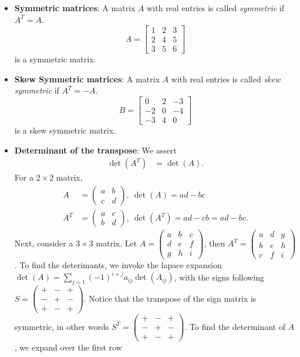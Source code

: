 \documentclass{report}
\begin{document}
\begin{itemize}
    \item \textbf{Symmetric matrices}: A matrix \( A \) with real entries is called \textit{symmetric} if \( A^T = A \).
        \[
            A = \begin{bmatrix}
                1 & 2 & 3 \\
                2 & 4 & 5 \\
                3 & 5 & 6
            \end{bmatrix}
        \]
        is a symmetric matrix.
    \item \textbf{Skew Symmetric matrices}: A matrix \( A \) with real entries is called \textit{skew symmetric} if \( A^T = -A \).
        \[
            B = \begin{bmatrix}
                0 & 2 & -3 \\
                -2 & 0 & -4 \\
                -3 & 4 & 0
            \end{bmatrix}
        \]
        is a skew symmetric matrix.
    \item \textbf{Determinant of the transpose}: We assert
        \begin{align*}
            \det(A^{T}) &= \det(A)
        .\end{align*}
        \bigbreak \noindent 
        For a $2\times 2$ matrix,
        \begin{align*}
            A &= \begin{pmatrix} a & b \\ c & d\end{pmatrix},\ \det(A) = ad -bc \\
            A^{T} &= \begin{pmatrix} a &c \\ b & d\end{pmatrix},\ \det(A^{T}) = ad -cb = ad-bc
        .\end{align*}
        Next, consider a $3\times 3$ matrix. Let $A = \begin{pmatrix} a & b & c \\ d & e & f \\ g & h & i\end{pmatrix} $, then $A^{T} = \begin{pmatrix} a & d & g \\ b & e & h \\ c & f & i\end{pmatrix} $. To find the deterimants, we invoke the lapace expansion $\det(A) = \sum_{j=1}(-1)^{i+j}a_{ij}\det(A_{ij}) $, with the signs following $S = \begin{pmatrix} + & - & + \\ - & + & - \\ + & - & +\end{pmatrix}$. Notice that the transpose of the sign matrix is symmetric, in other words $S^{T} = \begin{pmatrix} + & - &  + \\ - & + & - \\ + & - & + \end{pmatrix} $. To find the determinant of $A$, we expand over the first row

\end{itemize}
\end{document}
